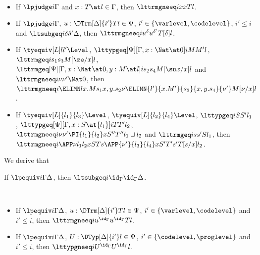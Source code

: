 \begin{law} $ $
  \begin{itemize}
  \item If $\lpjudge i \Gamma$ and $x : T \at l \in \Gamma$, then $\lttrmgneeq i x x
    T l$. 
  \item If $\lpjudge i \Gamma$, $u : \DTrm[\Delta]{i'}T l \in \Psi$,
    $i' \in \{\varlevel, \codelevel\}$, $i' \le i$ and $\ltsubgeq i \delta{\delta'} \Delta$, then
    \newline $\lttrmgneeq i{u^\delta}{u^{\delta'}} {T[\delta]} l$.
  \item If $\tyequiv[L]l{l'}\Level$, $\lttypgeq[\Psi][\Gamma, x : \Nat \at 0] i M{M'} l$,
    $\lttrmgeq i {s_1}{s_3} {M[\ze/x]}l$, \newline
    $\lttrmgeq[\Psi][\Gamma, x : \Nat \at 0, y : M \at l] i{s_2}{s_4}{M[\su
      x/x]}l$ and
    $\lttrmgneeq i \nu{\nu'} \Nat 0$, then \newline
    $\lttrmgneeq i{\ELIMN l{x.M}{s_1}{x,y. s_2}\nu}{\ELIMN{l'}{x.M'}{s_3}{x,y. s_4}{\nu'}}{M[\nu/x]}{l}$.
  \item If $\tyequiv[L]{l_1}{l_3}\Level$, $\tyequiv[L]{l_2}{l_4}\Level$, $\lttypgeq i S{S'}{l_1}$,
    $\lttypgeq[\Psi][\Gamma, x : S \at{l_1}] i{T}{T'}{l_2}$, 
    $\lttrmgneeq i \nu{\nu'}{\PI {l_1}{l_2} x{S''}{T''}}{l_1 \sqcup l_2}$ and $\lttrmgeq i
    s{s'} S{l_1}$, then \newline
    $\lttrmgneeq i{\APP \nu {l_1}{l_2} x S T s}{\APP{\nu'}{l_3}{l_4} x
      {S'}{T'}{s'}}{T[s/x]}{l_2}$. 

  \end{itemize}
\end{law}

We derive that
\begin{lemma}
  If $\lpequiv i \Gamma \Delta$, then
  $\ltsubgeq i{\id_{\Gamma}}{\id_{\Gamma}}{\Delta}$.
\end{lemma}

\begin{lemma} $ $
  \begin{itemize}
  \item If $\lpequiv i \Gamma \Delta$, $u : \DTrm[\Delta]{i'}T l \in \Psi$, $i' \in \{\varlevel, \codelevel\}$ and
    $i' \le i$, then $\lttrmgneeq i {u^{\id_{\Gamma}}}{u^{\id_{\Gamma}}} T l$.
  \item If $\lpequiv i \Gamma \Delta$, $U : \DTyp[\Delta]{i'} l \in \Psi$,
    $i' \in \{\codelevel, \proglevel\}$ and $i' \le i$, then $\lttypgneeq i{U^{\id_{\Gamma}}}{U^{\id_{\Gamma}}}{l}$.
  \end{itemize}
\end{lemma}

